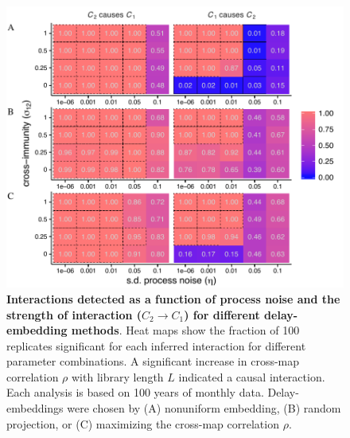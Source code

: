 \begin{figure}%
\begin{center}
  \includegraphics[width=6in]{dataflow/out/fig_detect_diffembed/fig_detect_diffembed.pdf}
  \end{center}
  \caption{\textbf{Interactions detected as a function of process noise and the strength of interaction ($C_2 \rightarrow C_1$) for different delay-embedding methods}. Heat maps show the fraction of 100 replicates significant for each inferred interaction for different parameter combinations. A significant increase in cross-map correlation $\rho$ with library length $L$ indicated a causal interaction. Each analysis is based on 100 years of monthly data. Delay-embeddings were chosen by (A) nonuniform embedding, (B) random projection, or (C) maximizing the cross-map correlation $\rho$.  \label{fig:detect_diffembed}}
\end{figure}


